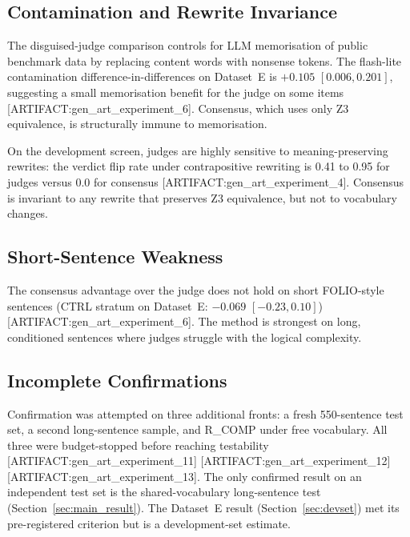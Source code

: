\documentclass[11pt,letterpaper]{article}
\begin{document}
\subsection{Contamination and Rewrite Invariance}
\label{sec:contamination}

The disguised-judge comparison controls for LLM memorisation of public benchmark data by replacing content words with nonsense tokens.
The flash-lite contamination difference-in-differences on Dataset~E is $+0.105$ $[0.006, 0.201]$, suggesting a small memorisation benefit for the judge on some items [ARTIFACT:gen\_art\_experiment\_6].
Consensus, which uses only Z3 equivalence, is structurally immune to memorisation.

On the development screen, judges are highly sensitive to meaning-preserving rewrites: the verdict flip rate under contrapositive rewriting is 0.41 to 0.95 for judges versus 0.0 for consensus [ARTIFACT:gen\_art\_experiment\_4].
Consensus is invariant to any rewrite that preserves Z3 equivalence, but not to vocabulary changes.

\subsection{Short-Sentence Weakness}
\label{sec:short_sentence}

The consensus advantage over the judge does not hold on short FOLIO-style sentences (CTRL stratum on Dataset~E: $-0.069$ $[-0.23, 0.10]$) [ARTIFACT:gen\_art\_experiment\_6].
The method is strongest on long, conditioned sentences where judges struggle with the logical complexity.

\subsection{Incomplete Confirmations}
\label{sec:incomplete}

Confirmation was attempted on three additional fronts: a fresh 550-sentence test set, a second long-sentence sample, and R\_COMP under free vocabulary.
All three were budget-stopped before reaching testability [ARTIFACT:gen\_art\_experiment\_11] [ARTIFACT:gen\_art\_experiment\_12] [ARTIFACT:gen\_art\_experiment\_13].
The only confirmed result on an independent test set is the shared-vocabulary long-sentence test (Section~\ref{sec:main_result}).
The Dataset~E result (Section~\ref{sec:devset}) met its pre-registered criterion but is a development-set estimate.

\end{document}
